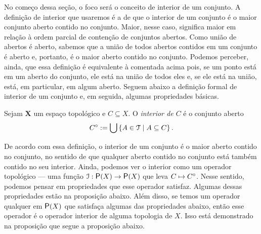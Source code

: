 	No começo dessa seção, o foco será o conceito de interior de um conjunto. A definição de interior que usaremos é a de que o interior de um conjunto é o maior conjunto aberto contido no conjunto. Maior, nesse caso, significa maior em relação à ordem parcial de contenção de conjuntos abertos. Como união de abertos é aberto, sabemos que a união de todos abertos contidos em um conjunto é aberto e, portanto, é o maior aberto contido no conjunto. Podemos perceber, ainda, que essa definição é equivalente à comentada acima pois, se um ponto está em um aberto do conjunto, ele está na união de todos eles e, se ele está na união, está, em particular, em algum aberto. Seguem abaixo a definição formal de interior de um conjunto e, em seguida, algumas propriedades básicas.

\begin{definition}
Sejam $\bm X$ um espaço topológico e $C \subseteq X$. O \emph{interior de $C$} é o conjunto aberto
	\begin{equation*}
	{C}^\circ := \bigcup \left\{{A \in \mathcal{T}}\;\middle\vert\;{A \subseteq C}\right\}.
	\end{equation*}
\end{definition}

De acordo com essa definição, o interior de um conjunto é o maior aberto contido no conjunto, no sentido de que qualquer aberto contido no conjunto está também contido no seu interior. Ainda, podemos ver o interior como um operador topológico --- uma função $\mathcal I: \p(X) \to \p(X)$ que leva $C \mapsto {C}^\circ$. Nesse sentido, podemos pensar em propriedades que esse operador satisfaz. Algumas dessas propriedades estão na proposição abaixo. Além disso, se temos um operador qualquer em $\p(X)$ que satisfaça algumas das propriedades abaixo, então esse operador é o operador interior de alguma topologia de $X$. Isso está demonstrado na proposição que segue a proposição abaixo.

